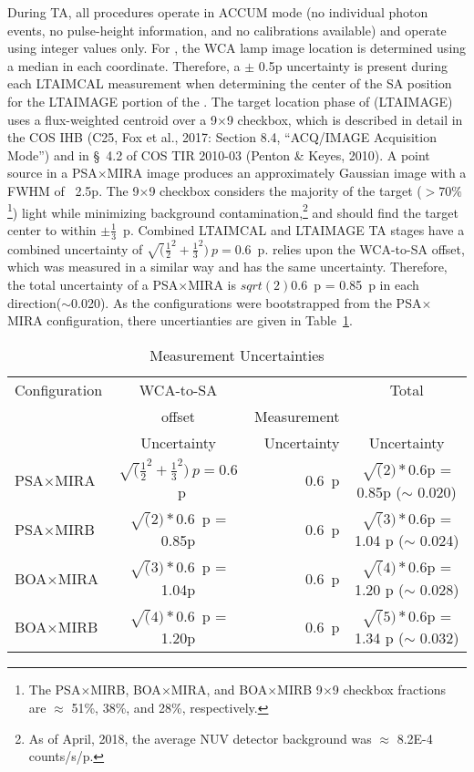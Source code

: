During TA, all \tacq{} procedures operate in ACCUM mode (no individual photon events, no pulse-height information, and no calibrations available) and operate using integer values only.
For , the WCA lamp image location is determined using a median in each coordinate. Therefore, a $\pm$ 0.5p uncertainty is present during each \textsc{LTAIMCAL} measurement when determining the center of the SA position for the
\textsc{LTAIMAGE} portion of the . The target location phase of  (\textsc{LTAIMAGE}) uses a flux-weighted centroid over a 9$\times$9 checkbox, which is described in detail in the COS IHB (C25, Fox et al., 2017: Section 8.4, ``ACQ/IMAGE Acquisition Mode'') and in \S~4.2
of COS TIR 2010-03 (Penton \& Keyes, 2010). A point source in a PSA$\times$MIRA image produces an approximately Gaussian image with a FWHM of ~2.5p.
The 9$\times$9 checkbox considers the majority of the target ($>70\%$\footnote{The PSA$\times$MIRB, BOA$\times$MIRA, and BOA$\times$MIRB 9$\times$9 checkbox fractions are $\approx$ 51\%, 38\%, and 28\%, respectively.})
light while minimizing background contamination,\footnote{As of April, 2018, the average NUV detector background was $\approx$ 8.2E-4 counts/s/p.} and should find the target center to within $\pm \frac{1}{3}$~p.
Combined \textsc{LTAIMCAL} and \textsc{LTAIMAGE} TA stages have a combined uncertainty of $\sqrt( \frac{1}{2}^2 + \frac{1}{3}^2 )~p = 0.6$~p.
 relies upon the WCA-to-SA offset, which was measured in a similar way and has the same uncertainty. Therefore, the total uncertainty
of a PSA$\times$MIRA  is $sqrt(2) 0.6$~p = 0.85~p in each direction($\sim$0.020\arcsec). As the
 configurations were bootstrapped from the PSA$\times$MIRA configuration, there uncertianties
are given in Table~\ref{tab:unc}.

\begin{table}[htb]
	\caption{ Measurement Uncertainties\label{tab:unc}}
	\begin{tabular}{lcrc}
	\toprule
	Configuration &	  WCA-to-SA     	& \tacq{IMAGE}  & Total \\
				  &    offset           & Measurement   & \tacq{IMAGE} \\
				  &  Uncertainty      &  Uncertainty   & Uncertainty \\
	\midrule
	PSA$\times$MIRA &	$\sqrt(\frac{1}{2}^2 + \frac{1}{3}^2 )~p = 0.6$~p	& 0.6~p	& $\sqrt(2) * 0.6$p = 0.85p ($\sim$ 0.020\arcsec) \\
	PSA$\times$MIRB &	$\sqrt(2) * 0.6$~p =	0.85p		& 0.6~p & $\sqrt(3) * 0.6$p = 1.04 p ($\sim$ 0.024\arcsec) \\
	BOA$\times$MIRA &	$\sqrt(3) * 0.6$~p =	1.04p		& 0.6~p & $\sqrt(4) * 0.6$p = 1.20 p ($\sim$ 0.028\arcsec) \\
	BOA$\times$MIRB &	$\sqrt(4) * 0.6$~p =	1.20p		& 0.6~p & $\sqrt(5) * 0.6$p = 1.34 p ($\sim$ 0.032\arcsec) \\
	\bottomrule
	\end{tabular}
\end{table}

